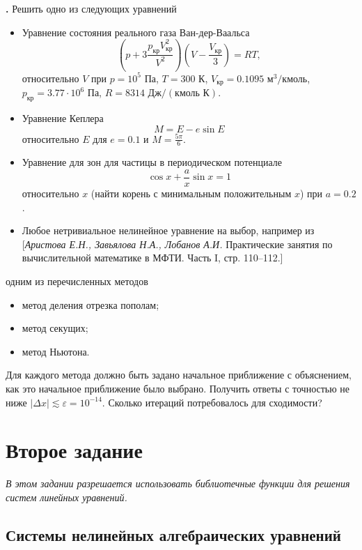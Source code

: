 \documentclass[12pt]{article}
\newcounter{task}
\newcommand{\problem}{\par\textbf{\stepcounter{task}\thetask. }}
\begin{document}
\problem Решить одно из следующих уравнений
\begin{itemize}
\item Уравнение состояния реального газа Ван-дер-Ваальса
\[
\left(p + 3\frac{p_\text{кр}V_\text{кр}^2}{V^2}\right) \left(V - \frac{V_\text{кр}}{3}\right) = RT,
\]
относительно $V$ при $p = 10^5 \text{ Па}$, $T = 300\text{ К}$, $V_\text{кр} =
0.1095 \text{ м}^3 / \text{кмоль}$,
$p_\text{кр} = 3.77\cdot 10^6 \text{ Па}$, $R = 8314 \text{ Дж} / (\text{кмоль
К})$.

\item Уравнение Кеплера
\[
M = E - e \sin E
\]
относительно $E$ для $e = 0.1$ и $M = \frac{5\pi}{6}$.

\item Уравнение для зон для частицы в периодическом потенциале
\[
\cos x + \frac{a}{x} \sin x = 1
\]
относительно $x$ (найти корень с минимальным положительным $x$) при $a = 0.2$.

\item Любое нетривиальное нелинейное уравнение на выбор, например из
[\textit{Аристова Е.Н., Завьялова Н.А., Лобанов А.И.} Практические занятия по
вычислительной математике в МФТИ. Часть I, стр. 110--112.]
\end{itemize}
одним из перечисленных методов
\begin{itemize}
\item метод деления отрезка пополам;
\item метод секущих;
\item метод Ньютона.
\end{itemize}

Для каждого метода должно быть задано начальное приближение с объяснением, как
это начальное приближение было выбрано. Получить ответы с точностью не ниже
$|\Delta x| \lesssim \varepsilon = 10^{-14}$. Сколько итераций потребовалось для
сходимости?

\section{Второе задание}

\emph{В этом задании разрешается использовать библиотечные функции для решения систем линейных уравнений.}

\subsection{Системы нелинейных алгебраических уравнений}
\end{document}

